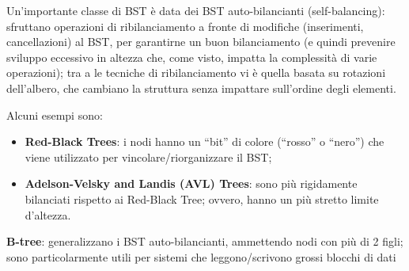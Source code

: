 Un'importante classe di BST è data dei BST auto-bilancianti
(self-balancing): sfruttano operazioni di ribilanciamento a fronte di
modifiche (inserimenti, cancellazioni) al BST, per garantirne un buon
bilanciamento (e quindi prevenire sviluppo eccessivo in altezza che,
come visto, impatta la complessità di varie operazioni); tra a le
tecniche di ribilanciamento vi è quella basata su rotazioni dell'albero,
che cambiano la struttura senza impattare sull'ordine degli elementi.

Alcuni esempi sono:

\begin{itemize}
\item
  \textbf{Red-Black Trees}: i nodi hanno un ``bit'' di colore (``rosso''
  o ``nero'') che viene utilizzato per vincolare/riorganizzare il BST;
\item
  \textbf{Adelson-Velsky and Landis (AVL) Trees}: sono più rigidamente
  bilanciati rispetto ai Red-Black Tree; ovvero, hanno un più stretto
  limite d'altezza.
\end{itemize}

\textbf{B-tree}: generalizzano i BST auto-bilancianti, ammettendo nodi
con più di 2 figli; sono particolarmente utili per sistemi che
leggono/scrivono grossi blocchi di dati
